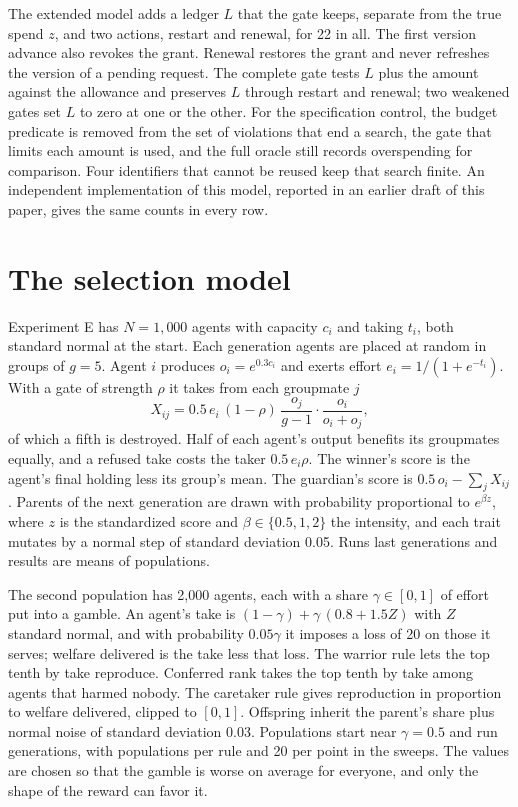 \documentclass[10pt,twocolumn]{article}
\theoremstyle{plain}
\theoremstyle{definition}
\begin{document}
The extended model adds a ledger $L$ that the gate keeps, separate from the true spend $z$,
and two actions, restart and renewal, for 22 in all. The first version advance also revokes
the grant. Renewal restores the grant and never refreshes the version of a pending request.
The complete gate tests $L$ plus the amount against the allowance and preserves $L$ through
restart and renewal; two weakened gates set $L$ to zero at one or the other. For the
specification control, the budget predicate is removed from the set of violations that end a
search, the gate that limits each amount is used, and the full oracle still records
overspending for comparison. Four identifiers that cannot be reused keep that search finite.
An independent implementation of this model, reported in an earlier draft of this paper,
gives the same counts in every row.

\section{The selection model}\label{app:selection}

Experiment E has $N=1{,}000$ agents with capacity $c_i$ and taking $t_i$, both standard normal
at the start. Each generation agents are placed at random in groups of $g=5$. Agent $i$
produces $o_i=e^{0.3c_i}$ and exerts effort $e_i=1/(1+e^{-t_i})$. With a gate of strength
$\rho$ it takes from each groupmate $j$
\[
X_{ij}=0.5\,e_i\,(1-\rho)\,\frac{o_j}{g-1}\cdot\frac{o_i}{o_i+o_j},
\]
of which a fifth is destroyed. Half of each agent's output benefits its groupmates equally,
and a refused take costs the taker $0.5\,e_i\rho$. The winner's score is the agent's final
holding less its group's mean. The guardian's score is $0.5\,o_i-\sum_j X_{ij}$. Parents of
the next generation are drawn with probability proportional to $e^{\beta z}$, where $z$ is
the standardized score and $\beta\in\{0.5,1,2\}$ the intensity, and each trait mutates by a
normal step of standard deviation 0.05. Runs last \SelGens{} generations and results are
means of \SelReps{} populations.

The second population has 2,000 agents, each with a share $\gamma\in[0,1]$ of effort put into
a gamble. An agent's take is $(1-\gamma)+\gamma\,(0.8+1.5Z)$ with $Z$ standard normal, and
with probability $0.05\gamma$ it imposes a loss of 20 on those it serves; welfare delivered
is the take less that loss. The warrior rule lets the top tenth by take reproduce. Conferred
rank takes the top tenth by take among agents that harmed nobody. The caretaker rule gives
reproduction in proportion to welfare delivered, clipped to $[0,1]$. Offspring inherit the
parent's share plus normal noise of standard deviation 0.03. Populations start near
$\gamma=0.5$ and run \ScGens{} generations, with \ScPops{} populations per rule and 20 per
point in the sweeps. The values are chosen so that the gamble is worse on average for
everyone, and only the shape of the reward can favor it.
\end{document}
